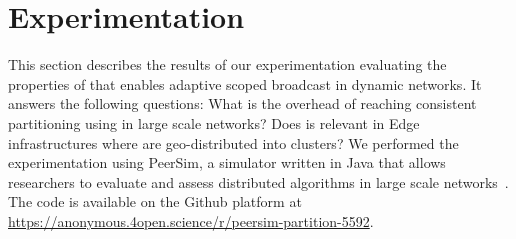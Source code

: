 
\section{Experimentation}
\label{sec:experimentation}

This section describes the results of our experimentation evaluating
the properties of \NAME that enables adaptive scoped broadcast in
dynamic networks. It answers the following questions: What is the
overhead of reaching consistent partitioning using \NAME in large
scale networks?  Does \NAME is relevant in Edge infrastructures where
\processes are geo-distributed into clusters? We performed the
experimentation using PeerSim, a simulator written in Java that allows
researchers to evaluate and assess distributed algorithms in large
scale networks~\cite{montresor2009peersim}. The code is available on
the Github platform at
\url{https://anonymous.4open.science/r/peersim-partition-5592}.


